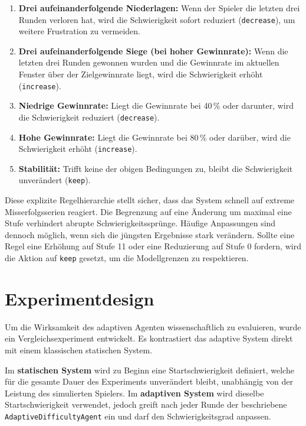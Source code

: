 \documentclass[11pt,a4paper]{article}
\begin{document}
\begin{enumerate}
    \item \textbf{Drei aufeinanderfolgende Niederlagen:} Wenn der Spieler die letzten drei Runden verloren hat, wird die Schwierigkeit sofort reduziert (\texttt{decrease}), um weitere Frustration zu vermeiden.
    \item \textbf{Drei aufeinanderfolgende Siege (bei hoher Gewinnrate):} Wenn die letzten drei Runden gewonnen wurden und die Gewinnrate im aktuellen Fenster über der Zielgewinnrate liegt, wird die Schwierigkeit erhöht (\texttt{increase}).
    \item \textbf{Niedrige Gewinnrate:} Liegt die Gewinnrate bei 40\,\% oder darunter, wird die Schwierigkeit reduziert (\texttt{decrease}).
    \item \textbf{Hohe Gewinnrate:} Liegt die Gewinnrate bei 80\,\% oder darüber, wird die Schwierigkeit erhöht (\texttt{increase}).
    \item \textbf{Stabilität:} Trifft keine der obigen Bedingungen zu, bleibt die Schwierigkeit unverändert (\texttt{keep}).
\end{enumerate}

Diese explizite Regelhierarchie stellt sicher, dass das System schnell auf extreme Misserfolgsserien reagiert. Die Begrenzung auf eine Änderung um maximal eine Stufe verhindert abrupte Schwierigkeitssprünge. Häufige Anpassungen sind dennoch möglich, wenn sich die jüngsten Ergebnisse stark verändern. Sollte eine Regel eine Erhöhung auf Stufe 11 oder eine Reduzierung auf Stufe 0 fordern, wird die Aktion auf \texttt{keep} gesetzt, um die Modellgrenzen zu respektieren.

\section{Experimentdesign}

Um die Wirksamkeit des adaptiven Agenten wissenschaftlich zu evaluieren, wurde ein Vergleichsexperiment entwickelt. Es kontrastiert das adaptive System direkt mit einem klassischen statischen System.

Im \textbf{statischen System} wird zu Beginn eine Startschwierigkeit definiert, welche für die gesamte Dauer des Experiments unverändert bleibt, unabhängig von der Leistung des simulierten Spielers. 
Im \textbf{adaptiven System} wird dieselbe Startschwierigkeit verwendet, jedoch greift nach jeder Runde der beschriebene \texttt{AdaptiveDifficultyAgent} ein und darf den Schwierigkeitsgrad anpassen.
\end{document}
